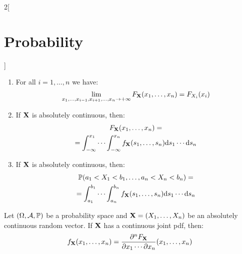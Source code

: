 \documentclass[../../../main.tex]{subfiles}
\begin{document}
\begin{multicols}{2}[\section{Probability}]
\begin{prop}
\begin{enumerate}
            \item For all $i=1,\ldots,n$ we have: $$\lim_{x_1,\ldots,x_{i-1},x_{i+1},\ldots,x_n\to+\infty}F_{\boldsymbol{\mathrm{X}}}(x_1,\ldots,x_n)=F_{X_i}(x_i)$$
            \item If $\boldsymbol{\mathrm{X}}$ is absolutely continuous, then:
                  \begin{multline*}
                      F_{\boldsymbol{\mathrm{X}}}(x_1,\ldots,x_n)=\\=\int_{-\infty}^{x_1}\cdots\int_{-\infty}^{x_n} f_{\boldsymbol{\mathrm{X}}}(s_1,\ldots,s_n)\dd s_1\cdots\dd s_n
                  \end{multline*}
            \item If $\boldsymbol{\mathrm{X}}$ is absolutely continuous, then:
                  \begin{multline*}
                      \mathbb{P}(a_1<X_1<b_1,\ldots,a_n<X_n<b_n)=\\=\int_{a_1}^{b_1}\cdots\int_{a_n}^{b_n} f_{\boldsymbol{\mathrm{X}}}(s_1,\ldots,s_n)\dd s_1\cdots\dd s_n
                  \end{multline*}
        \end{enumerate}
    \end{prop}
    \begin{prop}
        Let $(\Omega,\mathcal{A},\mathbb{P})$ be a probability space and $\boldsymbol{\mathrm{X}}=(X_1,\ldots,X_n)$ be an absolutely continuous random vector. If $\boldsymbol{\mathrm{X}}$ has a continuous joint pdf, then: $$f_{\boldsymbol{\mathrm{X}}}(x_1,\ldots,x_n)=\frac{\partial^nF_{\boldsymbol{\mathrm{X}}}}{\partial x_1\cdots\partial x_n}(x_1,\ldots,x_n)$$
    \end{prop}

\end{multicols}
\end{document}

